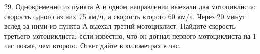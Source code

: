 29. Одновременно из пункта А в одном направлении выехали два мотоциклиста: скорость одного из них 75 км/ч, а скорость второго 60 км/ч. Через 20 минут вслед за ними из пункта А выехал третий мотоциклист. Найдите скорость третьего мотоциклиста, если известно, что он догнал первого мотоциклиста на 1 час позже, чем второго. Ответ дайте в километрах в час.\\
